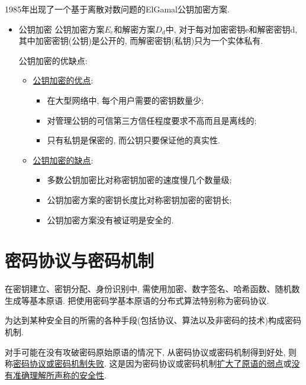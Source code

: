 \documentclass[UTF8]{ctexart}
\begin{document}
        1985年出现了一个基于离散对数问题的ElGamal公钥加密方案.

        \begin{itemize}
            \item 公钥加密
            公钥加密方案$E_e$和解密方案$D_d$中, 对于每对加密密钥e和解密密钥d, 其中加密密钥(公钥)是公开的, 而解密密钥(私钥)只为一个实体私有.

            公钥加密的优缺点:

            \begin{itemize}
                \item \underline{公钥加密的优点}:
                \begin{itemize}
                    \item 在大型网络中, 每个用户需要的密钥数量少;
                    \item 对管理公钥的可信第三方信任程度要求不高而且是离线的;
                    \item 只有私钥是保密的, 而公钥只要保证他的真实性.
                \end{itemize}
                \item \underline{公钥加密的缺点}:
                \begin{itemize}
                    \item 多数公钥加密比对称密钥加密的速度慢几个数量级;
                    \item 公钥加密方案的密钥长度比对称密钥加密的密钥长;
                    \item 公钥加密方案没有被证明是安全的.
                \end{itemize}
            \end{itemize}
        \end{itemize}

    \section{密码协议与密码机制}
        在密钥建立、密钥分配、身份识别中, 需使用加密、数字签名、哈希函数、随机数生成等基本原语. 把使用密码学基本原语的分布式算法特别称为密码协议.

        为达到某种安全目的所需的各种手段(包括协议、算法以及非密码的技术)构成密码机制.

        对手可能在没有攻破密码原始原语的情况下, 从密码协议或密码机制得到好处, 则称\underline{密码协议或密码机制失败}. 这是因为密码协议或密码机制\underline{扩大了原语的弱点}或\underline{没有准确理解所声称的安全性}.
\end{document}
